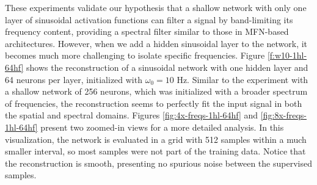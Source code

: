 These experiments validate our hypothesis that a shallow network with only one layer of sinusoidal activation functions can filter a signal by band-limiting its frequency content, providing a spectral filter similar to those in MFN-based architectures. However, when we add a hidden sinusoidal layer to the network, it becomes much more challenging to isolate specific frequencies. Figure \ref{f:w10-1hl-64hf} shows the reconstruction of a sinusoidal network with one hidden layer and 64 neurons per layer, initialized with $\omega_0=10$ Hz. Similar to the experiment with a shallow network of 256 neurons, which was initialized with a broader spectrum of frequencies, the reconstruction seems to perfectly fit the input signal in both the spatial and spectral domains. Figures \ref{fig:4x-freqs-1hl-64hf} and \ref{fig:8x-freqs-1hl-64hf} present two zoomed-in views for a more detailed analysis. In this visualization, the network is evaluated in a grid with 512 samples within a much smaller interval, so most samples were not part of the training data. Notice that the reconstruction is smooth, presenting no spurious noise between the supervised samples.


